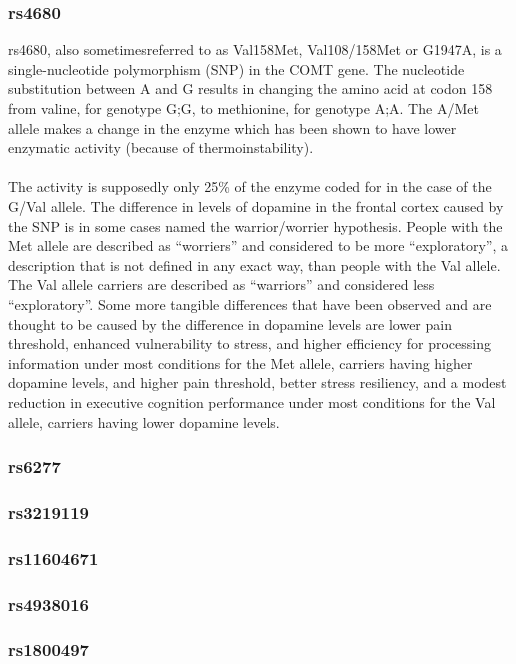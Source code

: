 \documentclass[11pt]{article}
\begin{document}
\subsubsection{rs4680}
rs4680, also sometimesreferred to as Val158Met, Val108/158Met or G1947A, is a single-nucleotide polymorphism (SNP) in the COMT gene. The nucleotide substitution between A and G results in changing the amino acid at codon 158 from valine, for genotype G;G, to methionine, for genotype A;A. The A/Met allele makes a change in the enzyme which has been shown to have lower enzymatic activity (because of thermoinstability).\cite{Rs46802020}\\
\\
The activity is supposedly only 25\% of the enzyme coded for in the case of the G/Val allele. The difference in levels of dopamine in the frontal cortex caused by the SNP is in some cases named the warrior/worrier hypothesis. People with the Met allele are described as ``worriers'' and considered to be more ``exploratory'', a description that is not defined in any exact way\cite{ExploratoryBehaviorOverview}, than people with the Val allele. The Val allele carriers are described as ``warriors'' and considered less ``exploratory''. Some more tangible differences that have been observed and are thought to be caused by the difference in dopamine levels are lower pain threshold, enhanced vulnerability to stress, and higher efficiency for processing information under most conditions for the Met allele, carriers having higher dopamine levels, and higher pain threshold, better stress resiliency, and a modest reduction in executive cognition performance under most conditions for the Val allele, carriers having lower dopamine levels.\cite{Rs4680SNPedia}
\cite{Rs4680SNPedia}

\subsubsection{rs6277}
\subsubsection{rs3219119}
\subsubsection{rs11604671}
\subsubsection{rs4938016}
\subsubsection{rs1800497}
\end{document}
